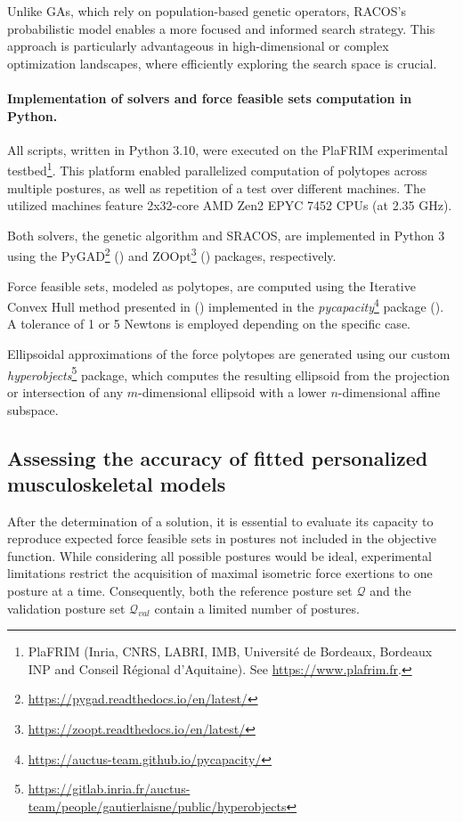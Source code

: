 Unlike GAs, which rely on population-based genetic operators, RACOS's probabilistic model enables a more focused and informed search strategy. This approach is particularly advantageous in high-dimensional or complex optimization landscapes, where efficiently exploring the search space is crucial.


\paragraph*{Implementation of solvers and force feasible sets computation in Python.} 
All scripts, written in Python 3.10, were executed on the PlaFRIM experimental testbed\footnote{PlaFRIM (Inria, CNRS, LABRI, IMB, Université de Bordeaux, Bordeaux INP and Conseil Régional d'Aquitaine). See \url{https://www.plafrim.fr}.}. This platform enabled parallelized computation of polytopes across multiple postures, as well as repetition of a test over different machines. The utilized machines feature 2x32-core AMD Zen2 EPYC 7452 CPUs (at 2.35 GHz).

Both solvers, the genetic algorithm and SRACOS, are implemented in Python 3 using the PyGAD\footnote{\url{https://pygad.readthedocs.io/en/latest/}} (\cite{gadPyGADIntuitiveGenetic2021}) and ZOOpt\footnote{\url{https://zoopt.readthedocs.io/en/latest/}} (\cite{liuZOOptToolboxDerivativeFree2022}) packages, respectively.
 
Force feasible sets, modeled as polytopes, are computed using the Iterative Convex Hull method presented in (\cite{skuricOnLineFeasibleWrench2022}) implemented in the \emph{pycapacity}\footnote{\url{https://auctus-team.github.io/pycapacity/}} package (\cite{skuricPycapacityRealtimeTaskspace2023}). A tolerance of 1 or 5 Newtons is employed depending on the specific case.

Ellipsoidal approximations of the force polytopes are generated using our custom \emph{hyperobjects}\footnote{\url{https://gitlab.inria.fr/auctus-team/people/gautierlaisne/public/hyperobjects}} package, which computes the resulting ellipsoid from the projection or intersection of any $m$-dimensional ellipsoid with a lower $n$-dimensional affine subspace.

\subsection{Assessing the accuracy of fitted personalized musculoskeletal models}
\label{subsec:validation_optimization_pb}

After the determination of a solution, it is essential to evaluate its capacity to reproduce expected force feasible sets in postures not included in the objective function. While considering all possible postures would be ideal, experimental limitations restrict the acquisition of maximal isometric force exertions to one posture at a time. Consequently, both the reference posture set $\mathcal{Q}$ and the validation posture set $\mathcal{Q}_{val}$ contain a limited number of postures.

